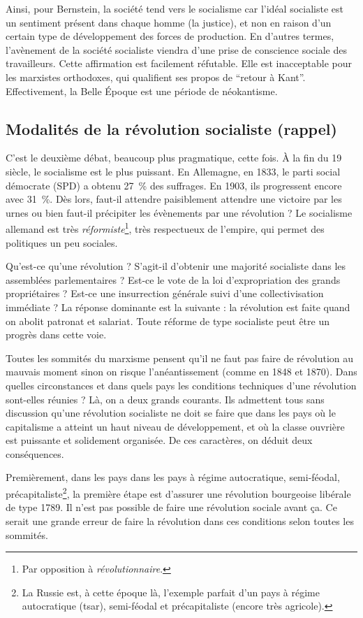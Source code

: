 \documentclass[12pt]{report}
\begin{document}
Ainsi, pour Bernstein, la société tend vers le socialisme car l’idéal socialiste est un sentiment présent dans chaque homme (la justice), et non en raison d'un certain type de développement des forces de production.
En d'autres termes, l’avènement de la société socialiste viendra d’une prise de conscience sociale des travailleurs. 
Cette affirmation est facilement réfutable.
Elle est inacceptable pour les marxistes orthodoxes, qui qualifient ses propos de \enquote{retour à Kant}.
Effectivement, la Belle Époque est une période de néokantisme.

\subsection{Modalités de la révolution socialiste (rappel)}

C'est le deuxième débat, beaucoup plus pragmatique, cette fois. 
À la fin du 19 siècle, le socialisme est le plus puissant.
En Allemagne, en 1833, le parti social démocrate (SPD) a obtenu 27~\% des suffrages.
En 1903, ils progressent encore avec 31~\%.
Dès lors, faut-il attendre paisiblement attendre une victoire par les urnes ou bien faut-il précipiter les évènements par une révolution ?
Le socialisme allemand est très \emph{réformiste}\footnote{Par opposition à \emph{révolutionnaire}.}, très respectueux de l'empire, qui permet des politiques un peu sociales.

Qu'est-ce qu'une révolution ?
S’agit-il d’obtenir une majorité socialiste dans les assemblées parlementaires ? 
Est-ce le vote de la loi d’expropriation des grands propriétaires ? 
Est-ce une insurrection générale suivi d’une collectivisation immédiate ? 
La réponse dominante est la suivante : la révolution est faite quand on abolit patronat et salariat.
Toute réforme de type socialiste peut être un progrès dans cette voie. 

Toutes les sommités du marxisme pensent qu’il ne faut pas faire de révolution au mauvais moment sinon on risque l’anéantissement (comme en 1848 et 1870).
Dans quelles circonstances et dans quels pays les conditions techniques d’une révolution sont-elles réunies ?
Là, on a deux grands courants.
Ils admettent tous sans discussion qu'une révolution socialiste ne doit se faire que dans les pays où le capitalisme a atteint un haut niveau de développement, et où la classe ouvrière est puissante et solidement organisée.
De ces caractères, on déduit deux conséquences.

Premièrement, dans les pays dans les pays à régime autocratique, semi-féodal, précapitaliste\footnote{La Russie est, à cette époque là, l'exemple parfait d'un pays à régime autocratique (tsar), semi-féodal et précapitaliste (encore très agricole).}, la première étape est d’assurer une révolution bourgeoise libérale de type 1789. 
Il n’est pas possible de faire une révolution sociale avant ça. 
Ce serait une grande erreur de faire la révolution dans ces conditions selon toutes les sommités.
\end{document}
